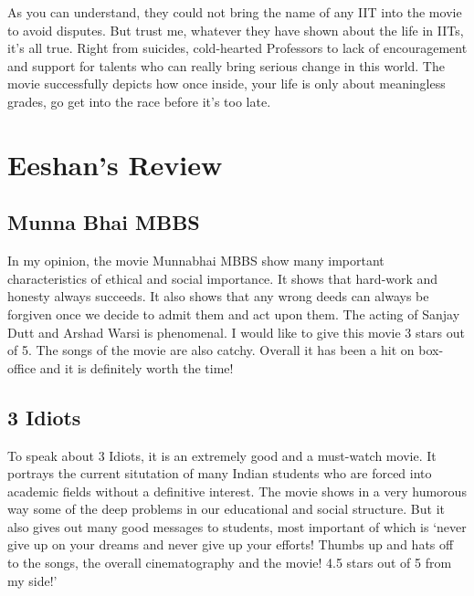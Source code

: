 \documentclass{article}
\begin{document}
As you can understand, they could not bring the name of any IIT into the movie to avoid disputes. But trust me, whatever they have shown about the life in IITs, it's all true. Right from suicides, cold-hearted Professors to lack of encouragement and support for talents who can really bring serious change in this world. The movie successfully depicts how once inside, your life is only about meaningless grades, go get into the race before it's too late.









\section{Eeshan's Review}
\subsection{Munna Bhai MBBS}
In my opinion, the movie Munnabhai MBBS show many important characteristics of ethical and social importance. It shows that hard-work and honesty always succeeds. It also shows that any wrong deeds can always be forgiven once we decide to admit them and act upon them. The acting of Sanjay Dutt and Arshad Warsi is phenomenal. I would like to give this movie 3 stars out of 5. The songs of the movie are also catchy. Overall it has been a hit on box-office and it is definitely worth the time! 
\subsection{3 Idiots}
To speak about 3 Idiots, it is an extremely good and a must-watch movie. It portrays the current situtation of many Indian students who are forced into academic fields without a definitive interest. The movie shows in a very humorous way some of the deep problems in our educational and social structure. But it also gives out many good messages to students, most important of which is `never give up on your dreams and never give up your efforts! Thumbs up and hats off to the songs, the overall cinematography and the movie! 4.5 stars out of 5 from my side!'
\end{document}
